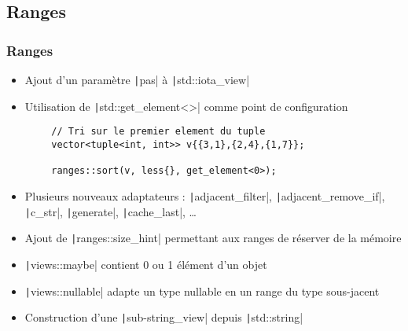 \documentclass[C++.tex]{subfiles}
\begin{document}
\subsection*{Ranges}
\begin{frame}[fragile]
	\frametitle{Ranges}
	\begin{itemize}
		\item Ajout d'un paramètre \texttt|pas| à \texttt|std::iota_view|
		\item Utilisation de \texttt|std::get_element<>| comme point de configuration
	\end{itemize}

	\begin{verbatim}
		// Tri sur le premier element du tuple
		vector<tuple<int, int>> v{{3,1},{2,4},{1,7}};

		ranges::sort(v, less{}, get_element<0>);
	\end{verbatim}

	\begin{itemize}
		\item Plusieurs nouveaux adaptateurs : \texttt|adjacent_filter|, \texttt|adjacent_remove_if|, \texttt|c_str|, \texttt|generate|,  \texttt|cache_last|, \ldots
		\item Ajout de \texttt|ranges::size_hint| permettant aux ranges de réserver de la mémoire
		\item \texttt|views::maybe| contient 0 ou 1 élément d'un objet
		\item \texttt|views::nullable| adapte un type nullable en un range du type sous-jacent
		\item Construction d'une \texttt|sub-string_view| depuis \texttt|std::string|
	\end{itemize}

\end{frame}
\end{document}
